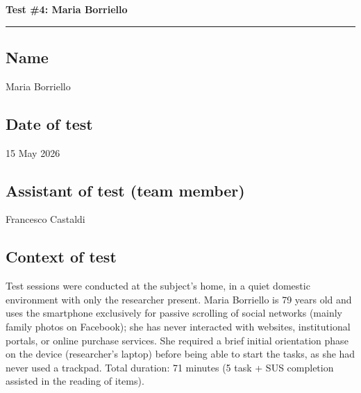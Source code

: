 ﻿\documentclass[11pt,a4paper]{article}
\begin{document}
\newpage
\begin{center}
  {\color{primaryColor}\large\bfseries Test \#4: Maria Borriello}\\
  \vspace{0.1cm}
  \color{borderColor}\hrule
\end{center}

\vspace{0.5cm}

\subsection*{Name}
\begin{tcolorbox}[base]
Maria Borriello
\end{tcolorbox}

\subsection*{Date of test}
\begin{tcolorbox}[base]
15 May 2026
\end{tcolorbox}

\subsection*{Assistant of test (team member)}
\begin{tcolorbox}[base]
Francesco Castaldi
\end{tcolorbox}

\subsection*{Context of test}
\begin{tcolorbox}[base]
Test sessions were conducted at the subject's home, in a
quiet domestic environment with only the
researcher present. Maria Borriello is 79 years old and uses the
smartphone exclusively for passive scrolling of
social networks (mainly family photos on
Facebook); she has never interacted with websites, institutional
portals, or online purchase services. She required
a brief initial orientation phase on the device
(researcher's laptop) before being able to start the tasks,
as she had never used a trackpad. Total
duration: 71 minutes (5 task + SUS completion assisted
in the reading of items).
\end{tcolorbox}
\end{document}
